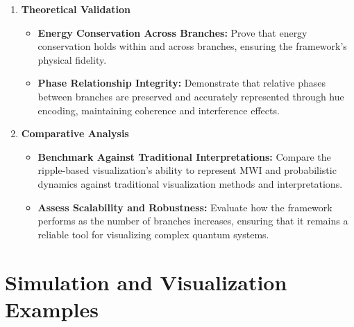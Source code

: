 \documentclass[12pt]{article}
\begin{document}
\begin{enumerate}
    \item \textbf{Theoretical Validation}
    \begin{itemize}
        \item \textbf{Energy Conservation Across Branches:} Prove that energy conservation holds within and across branches, ensuring the framework’s physical fidelity.
        
        \item \textbf{Phase Relationship Integrity:} Demonstrate that relative phases between branches are preserved and accurately represented through hue encoding, maintaining coherence and interference effects.
    \end{itemize}
    
    \item \textbf{Comparative Analysis}
    \begin{itemize}
        \item \textbf{Benchmark Against Traditional Interpretations:} Compare the ripple-based visualization’s ability to represent MWI and probabilistic dynamics against traditional visualization methods and interpretations.
        
        \item \textbf{Assess Scalability and Robustness:} Evaluate how the framework performs as the number of branches increases, ensuring that it remains a reliable tool for visualizing complex quantum systems.
    \end{itemize}
\end{enumerate}




















\section{Simulation and Visualization Examples}
\label{appendix:B}
\end{document}
